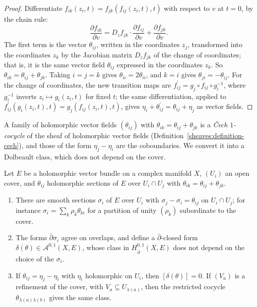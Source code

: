 \begin{proof}
Differentiate $f_{ik}(z_i, t) = f_{jk}(f_{ij}(z_i, t), t)$ with respect to $v$ at $t = 0$, by the chain rule:
\[
\frac{\partial f_{ik}}{\partial v} = D_zf_{jk}\cdot\frac{\partial f_{ij}}{\partial v} + \frac{\partial f_{jk}}{\partial v}.
\]
The first term is the vector $\theta_{ij}$, written in the coordinates $z_j$, transformed into the coordinates $z_k$ by the Jacobian matrix $D_zf_{jk}$ of the change of coordinates; that is, it is the same vector
field $\theta_{ij}$ expressed in the coordinates $z_k$. So $\theta_{ik} = \theta_{ij} + \theta_{jk}$. Taking $i = j = k$ gives $\theta_{ii} = 2\theta_{ii}$, and $k = i$ gives $\theta_{ji} = -\theta_{ij}$. For the change of
coordinates, the new transition maps are $f_{ij}^{\prime} = g_j \circ f_{ij} \circ g_i^{-1}$, where $g_i^{-1}$ inverts $z_i \mapsto g_i(z_i, t)$ for fixed $t$; the same differentiation, applied to
$f_{ij}^{\prime}(g_i(z_i, t), t) = g_j(f_{ij}(z_i, t), t)$, gives $\eta_i + \theta_{ij}^{\prime} = \theta_{ij} + \eta_j$ as vector fields.
\end{proof}

A family of holomorphic vector fields $(\theta_{ij})$ with $\theta_{ik} = \theta_{ij} + \theta_{jk}$ is a \emph{\v{C}ech $1$-cocycle} of the sheaf of holomorphic vector fields
(Definition~\ref{sheaves:definition-cech}), and those of the form $\eta_j - \eta_i$ are the coboundaries. We convert it into a Dolbeault class, which does not depend on the cover.

\begin{lemma}\label{deformations:lemma-cech-dolbeault}
Let $E$ be a holomorphic vector bundle on a complex manifold $X$, $(U_i)$ an open cover, and $\theta_{ij}$ holomorphic sections of $E$ over $U_i \cap U_j$ with $\theta_{ik} = \theta_{ij} + \theta_{jk}$.
\begin{enumerate}
\item There are smooth sections $\sigma_i$ of $E$ over $U_i$ with $\sigma_j - \sigma_i = \theta_{ij}$ on $U_i \cap U_j$; for instance $\sigma_i = \sum_k\rho_k\theta_{ki}$ for a partition of unity $(\rho_k)$ subordinate
to the cover.
\item The forms $\bar\partial\sigma_i$ agree on overlaps, and define a $\bar\partial$-closed form $\delta(\theta) \in \mathcal{A}^{0,1}(X, E)$, whose class in $H^{0,1}_{\bar\partial}(X, E)$ does not depend on the
choice of the $\sigma_i$.
\item If $\theta_{ij} = \eta_j - \eta_i$ with $\eta_i$ holomorphic on $U_i$, then $[\delta(\theta)] = 0$. If $(V_a)$ is a refinement of the cover, with $V_a \subseteq U_{\lambda(a)}$, then the restricted cocycle
$\theta_{\lambda(a)\lambda(b)}$ gives the same class.
\end{enumerate}
\end{lemma}

